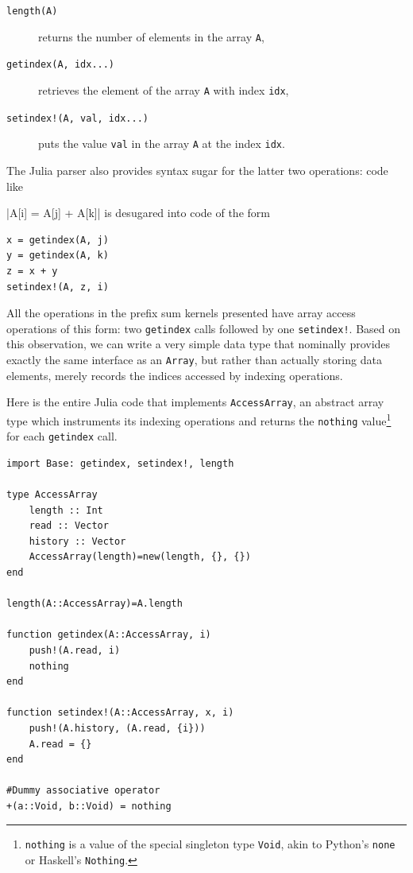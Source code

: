 \documentclass{sig-alternate}
\newcommand{\code}[1]{\texttt{#1}}
\begin{document}
\begin{description}
	\item[\code{length(A)}] returns the number of elements in the array
	      \code{A},
      	\item[\code{getindex(A, idx...)}] retrieves the element of the array
	      \code{A} with index \code{idx},
      	\item[\code{setindex!(A, val, idx...)}] puts the value \code{val} in
	      the array \code{A} at the index \code{idx}.
\end{description}

The Julia parser also provides syntax sugar for the latter two operations: code
like

|A[i] = A[j] + A[k]|
%
is desugared into code of the form

\begin{verbatim}
x = getindex(A, j)
y = getindex(A, k)
z = x + y
setindex!(A, z, i)
\end{verbatim}

All the operations in the prefix sum kernels presented have array access
operations of this form: two \code{getindex} calls followed by one
\code{setindex!}. Based on this observation, we can write a very simple data
type that nominally provides exactly the same interface as an \code{Array}, but
rather than actually storing data elements, merely records the indices accessed
by indexing operations.

Here is the entire Julia code that implements \code{AccessArray}, an abstract
array type which instruments its indexing operations and returns the
\code{nothing} value\footnote{\code{nothing} is a value of the special
singleton type \code{Void}, akin to Python's \code{none} or Haskell's
\code{Nothing}.} for each \code{getindex} call.

\begin{verbatim}
import Base: getindex, setindex!, length

type AccessArray
    length :: Int
    read :: Vector
    history :: Vector
    AccessArray(length)=new(length, {}, {})
end

length(A::AccessArray)=A.length

function getindex(A::AccessArray, i)
    push!(A.read, i)
    nothing
end

function setindex!(A::AccessArray, x, i)
    push!(A.history, (A.read, {i}))
    A.read = {}
end

#Dummy associative operator
+(a::Void, b::Void) = nothing
\end{verbatim}
\end{document}
